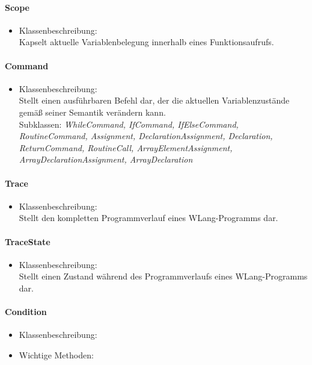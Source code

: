\documentclass[parskip=full]{scrartcl}
\begin{document}
\paragraph{Scope}
\begin{itemize}
\item Klassenbeschreibung: \\
Kapselt aktuelle Variablenbelegung innerhalb eines Funktionsaufrufs.
\end{itemize}
\paragraph{Command}
\begin{itemize}
\item Klassenbeschreibung: \\
Stellt einen ausführbaren Befehl dar, der die aktuellen Variablenzustände gemäß seiner Semantik verändern kann.\\
Subklassen: \textit{WhileCommand, IfCommand, IfElseCommand, RoutineCommand, Assignment, DeclarationAssignment, Declaration, ReturnCommand, RoutineCall, ArrayElementAssignment, ArrayDeclarationAssignment, ArrayDeclaration}
\end{itemize}
\paragraph{Trace}
\begin{itemize}
\item Klassenbeschreibung: \\
Stellt den kompletten Programmverlauf eines WLang-Programms dar.
\end{itemize}
\paragraph{TraceState}
\begin{itemize}
\item Klassenbeschreibung: \\
Stellt einen Zustand während des Programmverlaufs eines WLang-Programms dar.
\end{itemize}
\paragraph{Condition}
\begin{itemize}
\item Klassenbeschreibung: \\

\item Wichtige Methoden:\\

\end{itemize}
\end{document}
